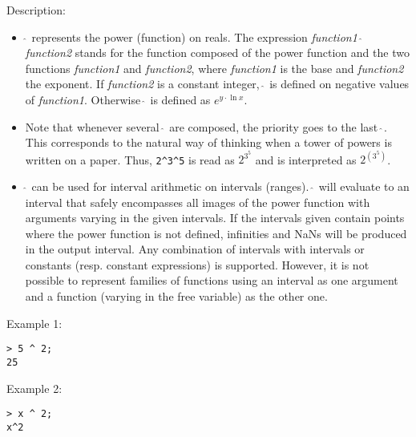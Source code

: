 \noindent Description: \begin{itemize}

\item \textbf{$\mathbf{\hat{~}}$} represents the power (function) on reals. 
   The expression \emph{function1} \textbf{$\mathbf{\hat{~}}$} \emph{function2} stands for
   the function composed of the power function and the two
   functions \emph{function1} and \emph{function2}, where \emph{function1} is
   the base and \emph{function2} the exponent.
   If \emph{function2} is a constant integer, \textbf{$\mathbf{\hat{~}}$} is defined
   on negative values of \emph{function1}. Otherwise \textbf{$\mathbf{\hat{~}}$}
   is defined as $e^{y \cdot \ln x}$.

\item Note that whenever several \textbf{$\mathbf{\hat{~}}$} are composed, the priority goes
   to the last \textbf{$\mathbf{\hat{~}}$}. This corresponds to the natural way of
   thinking when a tower of powers is written on a paper.
   Thus, \verb|2^3^5| is read as $2^{3^5}$ and is interpreted as $2^{(3^5)}$.

\item \textbf{$\mathbf{\hat{~}}$} can be used for interval arithmetic on intervals
   (ranges). \textbf{$\mathbf{\hat{~}}$} will evaluate to an interval that safely
   encompasses all images of the power function with arguments
   varying in the given intervals. If the intervals given contain points
   where the power function is not defined, infinities and NaNs will be
   produced in the output interval.  Any combination of intervals with
   intervals or constants (resp. constant expressions) is
   supported. However, it is not possible to represent families of
   functions using an interval as one argument and a function (varying in
   the free variable) as the other one.
\end{itemize}
\noindent Example 1: 
\begin{center}\begin{minipage}{15cm}\begin{Verbatim}[frame=single,commandchars=\\\|\~]
> 5 ^ 2;
25
\end{Verbatim}
\end{minipage}\end{center}
\noindent Example 2: 
\begin{center}\begin{minipage}{15cm}\begin{Verbatim}[frame=single,commandchars=\\\|\~]
> x ^ 2;
x^2
\end{Verbatim}
\end{minipage}\end{center}
